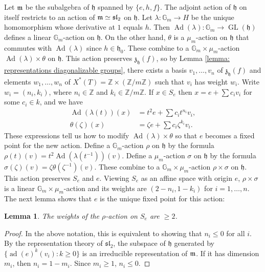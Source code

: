 \documentclass{article} %
\newtheorem{lemma}[proposition]{Lemma}
\numberwithin{equation}{section}
\theoremstyle{definition}
\newcommand{\G}{\mathbb{G}}
\DeclareMathOperator{\GL}{GL}
\DeclareMathOperator{\liesl}{\mathfrak{sl}}
\DeclareMathOperator{\Ad}{Ad}
\newcommand{\Z}{\mathbb{Z}}
\newcommand{\frakh}{\mathfrak h}
\newcommand{\frakz}{\mathfrak z}
\newcommand{\fraksl}{\mathfrak{sl}}
\DeclareMathOperator{\ad}{ad}
\begin{document}
Let $\frak{m}$ be the subalgebra of $\frakh$ spanned by $\{e,h,f\}$.
The adjoint action of $\frakh$ on itself restricts to an action of $\frak{m} \simeq \liesl_2$ on $\frakh$.
Let $\lambda\colon \G_m\rightarrow H$ be the unique homomorphism whose derivative at $1$ equals $h$.
Then $\Ad(\lambda)\colon \G_m\rightarrow \GL(\frakh)$ defines a linear $\G_m$-action on $\frakh$.
On the other hand, $\theta$ is a $\mu_m$-action on $\frakh$ that commutes with $\Ad(\lambda)$ since $h \in \frakh_0$.
These combine to a $\G_m\times \mu_m$-action $\Ad(\lambda) \times \theta$ on $\frakh$.
This action preserves $\frakz_{\frakh}(f)$, so by Lemma \ref{lemma: representations diagonalizable groups}, there exists a basis $v_1, \dots, v_n$ of $\frakz_{\frakh}(f)$ and elements $w_1, \dots, w_n$ of $X^*(T) = \Z \times (\Z/m\Z)$ such that $v_i$ has weight $w_i$.
Write $w_i = (n_i, k_i)$, where $n_i \in \Z$ and $k_i\in \Z/m\Z$.
If $x\in S_e$ then $x = e + \sum c_i v_i$ for some $c_i \in k$, and we have 
\begin{align*}
    \Ad(\lambda(t))(x) &= t^2 e + \sum c_i t^{n_i} v_i, \\
    \theta(\zeta)(x)&=\zeta e  + \sum c_i \zeta^{k_i}v_i.
\end{align*}
These expressions tell us how to modify $\Ad(\lambda)\times \theta$ so that $e$ becomes a fixed point for the new action. 
Define a $\G_m$-action $\rho$ on $\frakh$ by the formula $\rho(t)(v) = t^2 \Ad(\lambda(t^{-1}))(v)$.
Define a $\mu_m$-action $\sigma$ on $\frakh$ by the formula $\sigma(\zeta)(v) = \zeta \theta(\zeta^{-1})(v)$.
These combine to a $\G_m\times \mu_m$-action $\rho\times \sigma$ on $\frakh$. 
This action preserves $S_e$ and $e$.
Viewing $S_e$ as an affine space with origin $e$, $\rho\times \sigma$ is a linear $\G_m\times \mu_m$-action and its weights are $(2-n_i,1-k_i)$ for $i=1, \dots,n$.
The next lemma shows that $e$ is the unique fixed point for this action:
\begin{lemma}\label{lemma: weights of rho are positive}
    The weights of the $\rho$-action on $S_e$ are $\geq 2$.
\end{lemma}
\begin{proof}
    In the above notation, this is equivalent to showing that $n_i\leq 0$ for all $i$.
    By the representation theory of $\fraksl_2$, the subspace of $\frakh$ generated by  $\{\ad(e)^k(v_i)\colon k\geq 0\}$ is an irreducible representation of $\frak{m}$.
    If it has dimension $m_i$, then $n_i = 1-m_i$. 
    Since $m_i\geq 1$, $n_i\leq 0$.
\end{proof}
\end{document}
